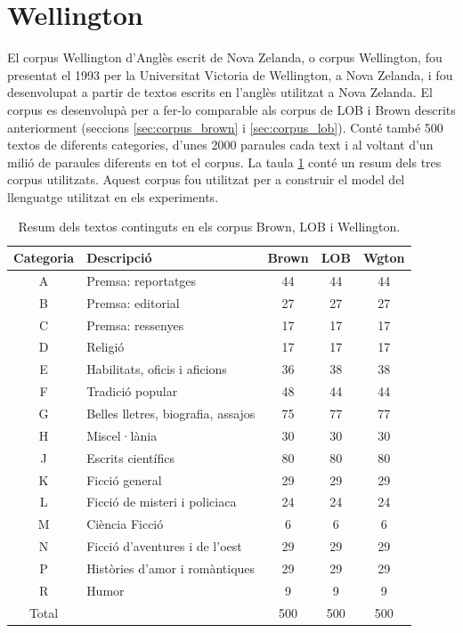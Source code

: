 \section{Wellington}\label{sec:corpus_wellington}
El corpus Wellington d'Anglès escrit de Nova Zelanda, o corpus Wellington, fou presentat el 1993\cite{bauer1993manual} per la Universitat Victoria de Wellington, a Nova Zelanda, i fou desenvolupat a partir de textos escrits en l'anglès utilitzat a Nova Zelanda. El corpus es desenvolupà per a fer-lo comparable als corpus de LOB i Brown descrits anteriorment (seccions \ref{sec:corpus_brown} i \ref{sec:corpus_lob}). Conté també 500 textos de diferents categories, d'unes 2000 paraules cada text i al voltant d'un milió de paraules diferents en tot el corpus. La taula \ref{tab:corpus_lm} conté un resum dels tres corpus utilitzats. Aquest corpus fou utilitzat per a construir el model del llenguatge utilitzat en els experiments.

\begin{table}
\centering
\begin{tabular}{|c|l|c|c|c|}
\hline
Categoria & Descripció & Brown & LOB & Wgton\\
\hline
A & Premsa: reportatges & 44 & 44 & 44\\
B & Premsa: editorial & 27 & 27 & 27\\
C & Premsa: ressenyes & 17 & 17 & 17\\
D & Religió & 17 & 17 & 17\\
E & Habilitats, oficis i aficions & 36 & 38 & 38\\
F & Tradició popular & 48 & 44 & 44\\
G & Belles lletres, biografia, assajos & 75 & 77 & 77\\
H & Miscel·lània & 30 & 30 & 30\\
J & Escrits científics & 80 & 80 & 80\\
K & Ficció general & 29 & 29 & 29\\
L & Ficció de misteri i policiaca & 24 & 24 & 24\\
M & Ciència Ficció & 6 & 6 & 6\\
N & Ficció d'aventures i de l'oest & 29 & 29 & 29\\
P & Històries d'amor i romàntiques & 29 & 29 & 29\\
R & Humor & 9 & 9 & 9\\
\hline
Total & & 500 & 500 & 500\\
\hline
\end{tabular}
\caption{Resum dels textos continguts en els corpus Brown, LOB i Wellington.}\label{tab:corpus_lm}
\end{table}
